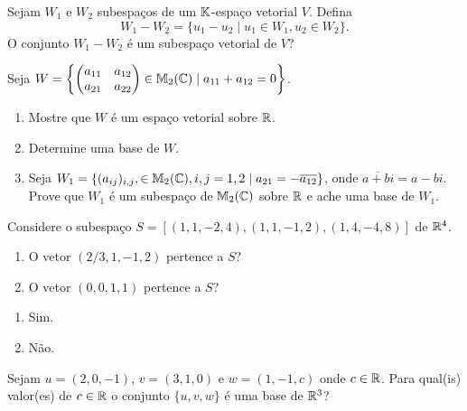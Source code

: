 \documentclass[12pt]{exam}
\begin{document}
\begin{exercicio}
	Sejam $W_1$ e $W_2$  subespa\c{c}os de um $\mathbb{K}$-espa\c{c}o vetorial $V$. Defina
	\[
	W_1 - W_2 = \{ u_1 - u_2 \mid u_1 \in W_1, u_2 \in W_2\}.
	\]
	O conjunto $W_1 - W_2$ \'e um subespa\c{c}o vetorial de $V$?
\end{exercicio}

\begin{exercicio}
	Seja $W = \left\{\begin{pmatrix} a_{11} & a_{12}\\ a_{21} & a_{22}\end{pmatrix} \in \mathbb{M}_2(\mathbb{C}) \mid a_{11} + a_{12} = 0\right\}$.
	\begin{enumerate}[label={\alph*})]
		\item Mostre que $W$ \'e um espa\c{c}o vetorial sobre $\mathbb{R}$.
		\item Determine uma base de $W$.
		\item Seja $W_1 = \{(a_{ij})_{i,j}, \in \mathbb{M}_2(\mathbb{C}), i, j = 1, 2 \mid a_{21} = -\overline{a_{12}}\}$, onde $\overline{a + bi} = a - bi$. Prove que $W_1$ \'e um subespa\c{c}o de $\mathbb{M}_2(\mathbb{C})$ sobre $\mathbb{R}$ e ache uma base de $W_1$.
	\end{enumerate}
\end{exercicio}

\begin{exercicio}
	Considere o subespa\c{c}o $S = [(1,1,-2,4),(1,1,-1,2),(1,4,-4,8)]$ de $\mathbb{R}^4$.
	\begin{enumerate}[label={\alph*})]
		\item O vetor $(2/3, 1, -1, 2)$ pertence a $S$?
		\item O vetor $(0, 0, 1, 1)$ pertence a $S$?
	\end{enumerate}
	\begin{solucao}
		\begin{enumerate}[label={\alph*})]
			\item Sim.
			\item N\~ao.
		\end{enumerate}
	\end{solucao}
\end{exercicio}

\begin{exercicio}
	Sejam $u = (2, 0 , -1)$, $v = (3, 1 , 0)$ e $w = (1, -1 , c)$ onde $c \in \mathbb{R}$. Para qual(is) valor(es) de $c \in \mathbb{R}$ o conjunto $\{u, v, w\}$ \'e uma base de $\mathbb{R}^3$?
\end{exercicio}
\end{document}
